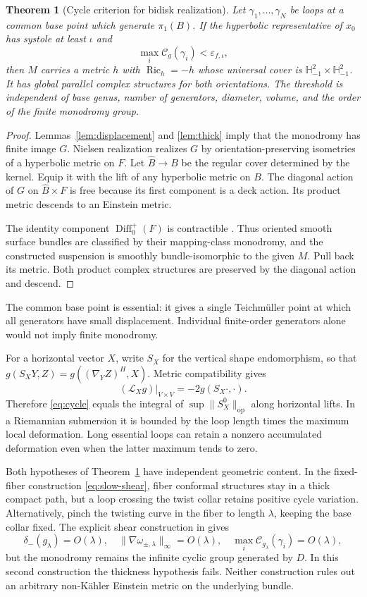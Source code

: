 \documentclass[11pt,a4paper]{article}
\newtheorem{theorem}{Theorem}[section]
\theoremstyle{definition}\newtheorem{definition}[theorem]{Definition}
\theoremstyle{remark}\newtheorem{remark}[theorem]{Remark}
\DeclareMathOperator{\Ric}{Ric}
\DeclareMathOperator{\Diff}{Diff}
\newcommand{\HH}{\mathbb H}
\newcommand{\op}{\mathrm{op}}
\begin{document}
\begin{theorem}[Cycle criterion for bidisk realization]\label{thm:cycles}
Let $\gamma_1,\ldots,\gamma_N$ be loops at a common base point which generate $\pi_1(B)$. If the hyperbolic representative of $x_0$ has systole at least $\iota$ and
\[
 \max_i\mathcal C_g(\gamma_i)<\varepsilon_{f,\iota},
\]
then $M$ carries a metric $h$ with $\Ric_h=-h$ whose universal cover is $\HH^2_{-1}\times\HH^2_{-1}$. It has global parallel complex structures for both orientations. The threshold is independent of base genus, number of generators, diameter, volume, and the order of the finite monodromy group.
\end{theorem}
\begin{proof}
Lemmas~\ref{lem:displacement} and \ref{lem:thick} imply that the monodromy has finite image $G$. Nielsen realization \cite{Kerckhoff} realizes $G$ by orientation-preserving isometries of a hyperbolic metric on $F$. Let $\widehat B\to B$ be the regular cover determined by the kernel. Equip it with the lift of any hyperbolic metric on $B$. The diagonal action of $G$ on $\widehat B\times F$ is free because its first component is a deck action. Its product metric descends to an Einstein metric.

The identity component $\Diff_0^+(F)$ is contractible \cite{EarleEells}. Thus oriented smooth surface bundles are classified by their mapping-class monodromy, and the constructed suspension is smoothly bundle-isomorphic to the given $M$. Pull back its metric. Both product complex structures are preserved by the diagonal action and descend.
\end{proof}

The common base point is essential: it gives a single Teichm\"uller point at which all generators have small displacement. Individual finite-order generators alone would not imply finite monodromy.

For a horizontal vector $X$, write $S_X$ for the vertical shape endomorphism, so that $g(S_XY,Z)=g((\nabla_YZ)^H,X)$. Metric compatibility gives
\[
 (\mathcal L_Xg)|_{V\times V}=-2g(S_X\cdot,\cdot).
\]
Therefore \eqref{eq:cycle} equals the integral of $\sup\|S_X^0\|_\op$ along horizontal lifts. In a Riemannian submersion it is bounded by the loop length times the maximum local deformation. Long essential loops can retain a nonzero accumulated deformation even when the latter maximum tends to zero.

Both hypotheses of Theorem~\ref{thm:cycles} have independent geometric content. In the fixed-fiber construction \eqref{eq:slow-shear}, fiber conformal structures stay in a thick compact path, but a loop crossing the twist collar retains positive cycle variation. Alternatively, pinch the twisting curve in the fiber to length $\lambda$, keeping the base collar fixed. The explicit shear construction in \cite{source-cycles} gives
\[
 \delta_-(g_\lambda)=O(\lambda),\quad
 \|\nabla\omega_{\pm,\lambda}\|_\infty=O(\lambda),\quad
 \max_i\mathcal C_{g_\lambda}(\gamma_i)=O(\lambda),
\]
but the monodromy remains the infinite cyclic group generated by $D$. In this second construction the thickness hypothesis fails. Neither construction rules out an arbitrary non-K\"ahler Einstein metric on the underlying bundle.
\end{document}
